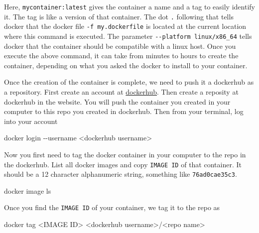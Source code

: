 \documentclass[
  letterpaper,
  DIV=11,
  numbers=noendperiod]{scrartcl}
\newenvironment{Shaded}{\begin{snugshade}}{\end{snugshade}}
\newcommand{\AttributeTok}[1]{\textcolor[rgb]{0.40,0.45,0.13}{#1}}
\newcommand{\ExtensionTok}[1]{\textcolor[rgb]{0.00,0.23,0.31}{#1}}
\newcommand{\NormalTok}[1]{\textcolor[rgb]{0.00,0.23,0.31}{#1}}
\newcommand{\OperatorTok}[1]{\textcolor[rgb]{0.37,0.37,0.37}{#1}}
\begin{document}
Here, \texttt{mycontainer:latest} gives the container a name and a tag
to easily identify it. The tag is like a version of that container. The
dot \texttt{.} following that tells docker that the docker file
\texttt{-f\ my.dockerfile} is located at the current location where this
command is executed. The parameter \texttt{-\/-platform\ linux/x86\_64}
tells docker that the container should be compatible with a linux host.
Once you execute the above command, it can take from minutes to hours to
create the container, depending on what you asked the docker to install
to your container.

Once the creation of the container is complete, we need to push it a
dockerhub as a repository. First create an account at
\href{https://hub.docker.com/}{dockerhub}. Then create a reposity at
dockerhub in the website. You will push the container you created in
your computer to this repo you created in dockerhub. Then from your
terminal, log into your account

\begin{Shaded}
\begin{Highlighting}[]
\ExtensionTok{docker}\NormalTok{ login }\AttributeTok{{-}{-}username} \OperatorTok{\textless{}}\NormalTok{dockerhub username}\OperatorTok{\textgreater{}}
\end{Highlighting}
\end{Shaded}

Now you first need to tag the docker container in your computer to the
repo in the dockerhub. List all docker images and copy
\texttt{IMAGE\ ID} of that container. It should be a 12 character
alphanumeric string, something like \texttt{76ad0cae35c3}.

\begin{Shaded}
\begin{Highlighting}[]
\ExtensionTok{docker}\NormalTok{ image ls}
\end{Highlighting}
\end{Shaded}

Once you find the \texttt{IMAGE\ ID} of your container, we tag it to the
repo as

\begin{Shaded}
\begin{Highlighting}[]
\ExtensionTok{docker}\NormalTok{ tag }\OperatorTok{\textless{}}\NormalTok{IMAGE ID}\OperatorTok{\textgreater{}} \OperatorTok{\textless{}}\NormalTok{dockerhub username}\OperatorTok{\textgreater{}}\NormalTok{/}\OperatorTok{\textless{}}\NormalTok{repo name}\OperatorTok{\textgreater{}}
\end{Highlighting}
\end{Shaded}
\end{document}
